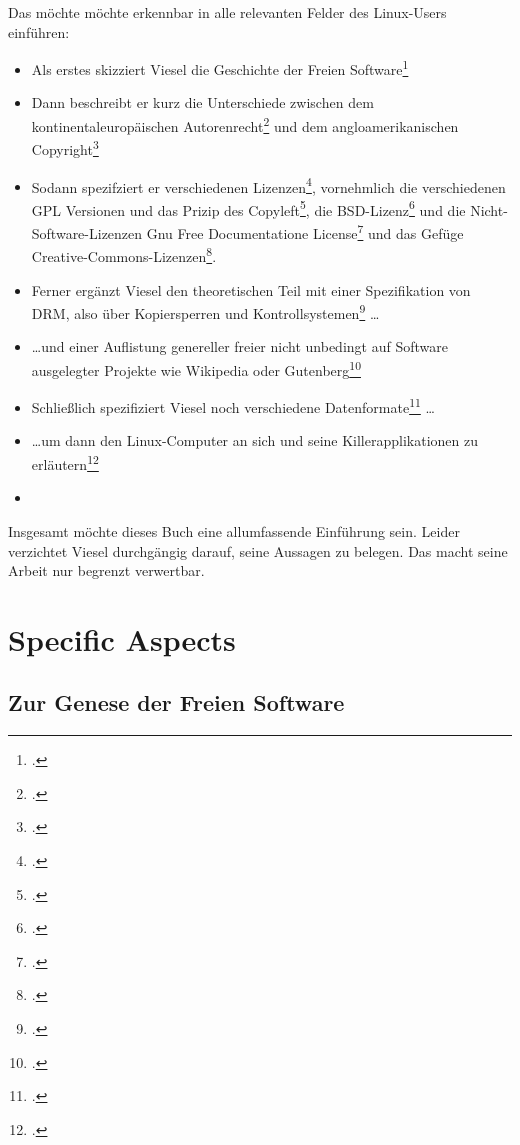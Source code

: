 \documentclass[DIV=calc,BCOR=5mm,11pt,headings=small,oneside,abstract=true, toc=bib]{scrartcl}
\begin{document}
Das möchte möchte erkennbar in alle relevanten Felder des Linux-Users einführen:
\begin{itemize}
  \item Als erstes skizziert Viesel die \glqq{}Geschichte der Freien
  Software\grqq{}\footcite[vgl.][11ff]{Viesel2006a}
  \item Dann beschreibt er kurz die Unterschiede zwischen dem
  \glqq{}kontinentaleuropäischen
  Autorenrecht\grqq{}\footcite[vgl.][46ff]{Viesel2006a} und dem
  \glqq{}angloamerikanischen Copyright\grqq{}\footcite[vgl.][53ff]{Viesel2006a}
  \item Sodann spezifziert er verschiedenen
  Lizenzen\grqq{}\footcite[vgl.][58ff]{Viesel2006a}, vornehmlich die
  verschiedenen GPL Versionen und das \glqq{}Prizip des
  Copyleft\grqq{}\footcite[vgl.][60ff]{Viesel2006a}, die
  BSD-Lizenz\footcite[vgl.][67f]{Viesel2006a} und die Nicht-Software-Lizenzen
  \glqq{}Gnu Free Documentatione
  License\grqq{}\footcite[vgl.][68f]{Viesel2006a} und das Gefüge
  \glqq{}Creative-Commons-Lizenzen\grqq{}\footcite[vgl.][69ff]{Viesel2006a}.
  \item Ferner ergänzt Viesel den theoretischen Teil mit einer
  Spezifikation von DRM, also über \glqq{}Kopiersperren und
  Kontrollsystemen\grqq{}\footcite[vgl.][69ff]{Viesel2006a} \ldots
  \item \ldots und einer Auflistung genereller freier nicht unbedingt auf
  Software ausgelegter Projekte wie Wikipedia oder
  Gutenberg\footcite[vgl.][88ff]{Viesel2006a}
  \item Schließlich spezifiziert Viesel noch verschiedene
  Datenformate\footcite[vgl.][113ff]{Viesel2006a} \ldots
  \item \ldots um dann den Linux-Computer an sich und seine
  Killerapplikationen zu erläutern\footcite[vgl.][141ff]{Viesel2006a}
  \item 
\end{itemize}
Insgesamt möchte dieses Buch eine allumfassende Einführung sein. Leider
verzichtet Viesel durchgängig darauf, seine Aussagen zu belegen. Das macht seine
Arbeit nur begrenzt verwertbar.

\section{Specific Aspects}

\subsection{Zur Genese der Freien Software}
\end{document}
